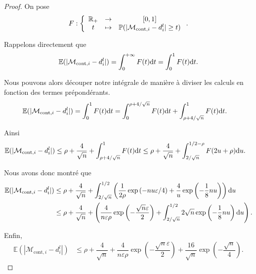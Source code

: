 \begin{proof}
    On pose 
    \[
        F : \left\{
            \begin{array}[]{ccc}
                \R_+ & \to & [0,1]\\
                t & \mapsto & \mathbb P(|\mathcal M_{\text{cont}, i} - d_i^l| \geq t)
            \end{array}
        \right.   .
    \]

    Rappelons directement que
    \[
            \mathbb E(|\mathcal M_{\text{cont}, i} - d_i^l|) = \int_0^{+\infty} F(t) \mathrm{d} t = \int_0^1 F(t) \mathrm{d} t.
    \]

    Nous pouvons alors découper notre intégrale de manière à diviser les calculs en fonction des termes prépondérants. 
    \begin{align*}
        \mathbb E(|\mathcal M_{\text{cont}, i} - d_i^l|) & = \int_0^1 F(t) \mathrm{d} t = \int_0^{\rho + 4/\sqrt n} F(t) \mathrm{d} t + \int_{\rho + 4/\sqrt n}^1 F(t) \mathrm{d} t.
    \end{align*}

    Ainsi
    \begin{align*}
        \mathbb E(|\mathcal M_{\text{cont}, i} - d_i^l|) & \leq \rho + \dfrac{4}{\sqrt n}  + \int_{\rho + 4/\sqrt n}^1 F(t) \mathrm{d} t \leq \rho + \dfrac{4}{\sqrt n}  + \int_{2/\sqrt n}^{1/2 - \rho} F(2u + \rho) \mathrm{d} u.
    \end{align*}

    Nous avons donc montré que
    \begin{align*}
        \mathbb E(|\mathcal M_{\text{cont}, i} - d_i^l|) & \leq \rho + \dfrac{4}{\sqrt n}  + \int_{2/\sqrt n}^{1/2} \left( \dfrac{1}{2\rho}\exp\left( -{nu\varepsilon}/{4} \right) + \dfrac{4}{u}\exp\left( - \dfrac{1}{8}n u \right) \right) \mathrm{d} u\\
        & \leq \rho + \dfrac{4}{\sqrt n}  + \left( \dfrac{4}{n\varepsilon\rho}\exp\left( -\dfrac{\sqrt n \varepsilon}{2} \right) + \int_{2/\sqrt n}^{1/2} 2\sqrt n \exp\left( - \dfrac{1}{8}n u \right) \mathrm{d} u \right).
    \end{align*}

    Enfin, 
    \begin{align*}
        \mathbb E(|\mathcal M_{\text{cont}, i} - d_i^l|) & \leq \rho + \dfrac{4}{\sqrt n} +\dfrac{4}{n\varepsilon\rho}\exp\left( -\dfrac{\sqrt n \varepsilon}{2} \right) + \dfrac{16}{\sqrt{n}}\exp\left( -\dfrac{\sqrt n }{4} \right).
    \end{align*}
\end{proof}

